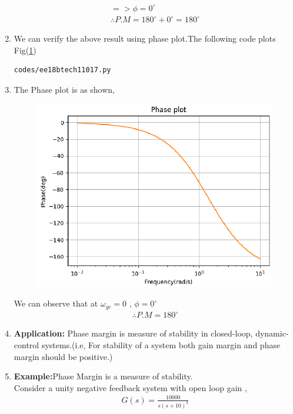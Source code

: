 \begin{enumerate}[label=\thesection.\arabic*.,ref=\thesection.\theenumi]
\begin{align}
=> \phi=0^{\circ}
\\
\therefore P.M=180^{\circ}+0^{\circ}=180^{\circ}
\end{align}

\item
We can verify the above result using phase plot.The following code plots Fig(\ref{fig:ee18btech11017})
\begin{lstlisting}
codes/ee18btech11017.py
\end{lstlisting}
\item
The Phase plot is as shown,
\begin{figure}[!h]
  \includegraphics[width=\columnwidth]{./figures/ee18btech11017.eps}
  \caption{}
  \label{fig:ee18btech11017}
\end{figure}
We can observe that at $\omega_{gc}=0$ , $\phi=0^{\circ}$
\\
\begin{align}
\therefore P.M=180^{\circ}
\end{align}
\item
\textbf{Application:} 
Phase margin is measure of stability in closed-loop, dynamic-control systems.(i.e, For stability of a system both gain margin and phase margin should be positive.)
\item
\textbf{Example:}Phase Margin is a measure of stability. \\
Consider a unity negative feedback system with open loop gain ,
\\
\begin{align}
G(s)=\frac{10000}{s(s+10)^{2}}

\end{align}
\end{enumerate}
